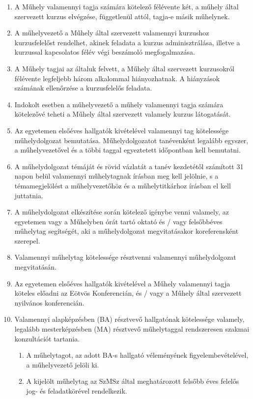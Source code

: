\documentclass{../styles/rulebook}
\begin{document}
\begin{enumerate}
	\item A Műhely valamennyi tagja számára kötelező félévente két, a műhely által
	szervezett kurzus elvégzése, függetlenül attól, tagja-e másik műhelynek.
	\item A műhelyvezető a Műhely által szervezett valamennyi kurzushoz kurzusfelelőst
	rendelhet, akinek feladata a kurzus adminisztrálása, illetve a kurzussal kapcsolatos
	félév végi beszámoló megfogalmazása.
	\item A Műhely tagjai az általuk felvett, a Műhely által szervezett kurzusokról félévente
	legfeljebb három alkalommal hiányozhatnak. A hiányzások számának ellenőrzése a
	kurzusfelelős feladata.
	\item Indokolt esetben a műhelyvezető a műhely valamennyi tagja számára
	kötelezővé teheti a Műhely által szervezett valamely kurzus látogatását.
	\item Az egyetemen elsőéves hallgatók kivételével valamennyi tag kötelessége
	műhelydolgozat bemutatása. Műhelydolgozatot tanévenként legalább egyszer, a
	műhelyvezetővel és a többi taggal egyeztetett időpontban kell bemutatni.
	\item A műhelydolgozat témáját és rövid vázlatát a tanév kezdetétől számított 31
	napon belül valamennyi műhelytagnak írásban meg kell jelölnie, s a
	témamegjelölést a műhelyvezetőhöz és a műhelytitkárhoz írásban el kell juttatnia.
	\item A műhelydolgozat elkészítése során kötelező igénybe venni valamely, az
	egyetemen vagy a Műhelyben órát tartó oktató és / vagy felsőbbéves műhelytag
	segítségét, aki a műhelydolgozat megvitatásakor koreferensként szerepel.
	\item Valamennyi műhelytag kötelessége résztvenni valamennyi műhelydolgozat
	megvitatásán.
	\item Az egyetemen elsőéves hallgatók kivételével a Műhely valamennyi tagja köteles
	előadni az Eötvös Konferencián, és / vagy a Műhely által szervezett nyilvános
	konferencián.
	\item Valamennyi alapképzésben (BA) résztvevő hallgatónak kötelessége valamely,
	legalább mesterképzésben (MA) résztvevő műhelytaggal rendszeresen szakmai
	konzultációt tartania. 
	\begin{enumerate}
		\item A műhelytagot, az adott BA-s hallgató véleményének figyelembevételével, a műhelyvezető jelöli ki. 
		\item A kijelölt műhelytag az SzMSz által meghatározott felsőbb éves felelős jog- és feladatkörével rendelkezik.

\end{enumerate}
\end{enumerate}
\end{document}

